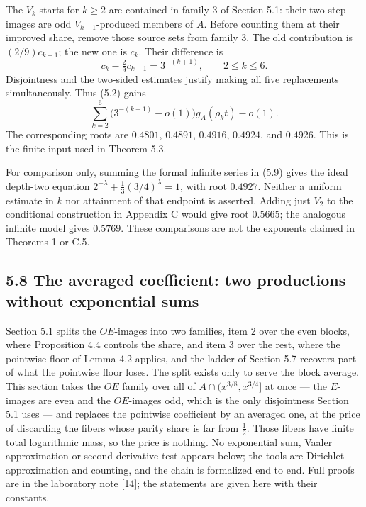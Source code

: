 \documentclass[11pt,a4paper]{article}
\begin{document}
The \(V_k\)-starts for \(k\ge2\) are contained in family 3 of Section
5.1: their two-step images are odd \(V_{k-1}\)-produced members of
\(A\). Before counting them at their improved share, remove those source
sets from family 3. The old contribution is \((2/9)c_{k-1}\); the new
one is \(c_k\). Their difference is \[
c_k-\tfrac29c_{k-1}=3^{-(k+1)},\qquad 2\le k\le6.
\tag{5.9}
\] Disjointness and the two-sided estimates justify making all five
replacements simultaneously. Thus (5.2) gains \[
\sum_{k=2}^{6}\bigl(3^{-(k+1)}-o(1)\bigr)g_A(\rho_k t)-o(1).
\tag{5.10}
\] The corresponding roots are \(0.4801\), \(0.4891\), \(0.4916\),
\(0.4924\), and \(0.4926\). This is the finite input used in Theorem
5.3.

For comparison only, summing the formal infinite series in (5.9) gives
the ideal depth-two equation \(2^{-\lambda}+\tfrac13(3/4)^\lambda=1\),
with root \(0.4927\). Neither a uniform estimate in \(k\) nor attainment
of that endpoint is asserted. Adding just \(V_2\) to the conditional
construction in Appendix C would give root \(0.5665\); the analogous
infinite model gives \(0.5769\). These comparisons are not the exponents
claimed in Theorems 1 or C.5.

\subsection{5.8 The averaged coefficient: two productions without
exponential
sums}\label{the-averaged-coefficient-two-productions-without-exponential-sums}

Section 5.1 splits the \(OE\)-images into two families, item 2 over the
even blocks, where Proposition 4.4 controls the share, and item 3 over
the rest, where the pointwise floor of Lemma 4.2 applies, and the ladder
of Section 5.7 recovers part of what the pointwise floor loses. The
split exists only to serve the block average. This section takes the
\(OE\) family over all of \(A\cap(x^{3/8},x^{3/4}]\) at once --- the
\(E\)-images are even and the \(OE\)-images odd, which is the only
disjointness Section 5.1 uses --- and replaces the pointwise coefficient
by an averaged one, at the price of discarding the fibers whose parity
share is far from \(\tfrac12\). Those fibers have finite total
logarithmic mass, so the price is nothing. No exponential sum, Vaaler
approximation or second-derivative test appears below; the tools are
Dirichlet approximation and counting, and the chain is formalized end to
end. Full proofs are in the laboratory note {[}14{]}; the statements are
given here with their constants.
\end{document}
